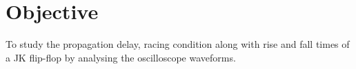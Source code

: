 \section{Objective}
To study the propagation delay, racing condition along with rise and fall times of a JK flip-flop by analysing the oscilloscope waveforms.